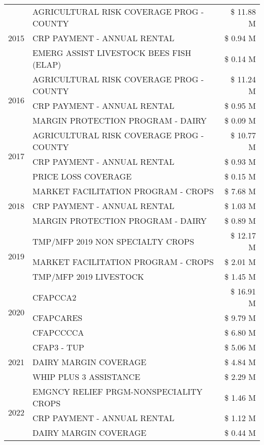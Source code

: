 \begin{tabular}{llr}
\cline{1-3}
\multirow[t]{3}{*}{2015} & AGRICULTURAL RISK COVERAGE PROG - COUNTY & \$ 11.88 M \\
 & CRP PAYMENT - ANNUAL RENTAL & \$ 0.94 M \\
 & EMERG ASSIST LIVESTOCK BEES FISH (ELAP) & \$ 0.14 M \\
\cline{1-3}
\multirow[t]{3}{*}{2016} & AGRICULTURAL RISK COVERAGE PROG - COUNTY & \$ 11.24 M \\
 & CRP PAYMENT - ANNUAL RENTAL & \$ 0.95 M \\
 & MARGIN PROTECTION PROGRAM - DAIRY & \$ 0.09 M \\
\cline{1-3}
\multirow[t]{3}{*}{2017} & AGRICULTURAL RISK COVERAGE PROG - COUNTY & \$ 10.77 M \\
 & CRP PAYMENT - ANNUAL RENTAL & \$ 0.93 M \\
 & PRICE LOSS COVERAGE & \$ 0.15 M \\
\cline{1-3}
\multirow[t]{3}{*}{2018} & MARKET FACILITATION PROGRAM - CROPS & \$ 7.68 M \\
 & CRP PAYMENT - ANNUAL RENTAL & \$ 1.03 M \\
 & MARGIN PROTECTION PROGRAM - DAIRY & \$ 0.89 M \\
\cline{1-3}
\multirow[t]{3}{*}{2019} & TMP/MFP 2019 NON SPECIALTY CROPS & \$ 12.17 M \\
 & MARKET FACILITATION PROGRAM - CROPS & \$ 2.01 M \\
 & TMP/MFP 2019 LIVESTOCK & \$ 1.45 M \\
\cline{1-3}
\multirow[t]{3}{*}{2020} & CFAPCCA2 & \$ 16.91 M \\
 & CFAPCARES & \$ 9.79 M \\
 & CFAPCCCCA & \$ 6.80 M \\
\cline{1-3}
\multirow[t]{3}{*}{2021} & CFAP3 - TUP & \$ 5.06 M \\
 & DAIRY MARGIN COVERAGE & \$ 4.84 M \\
 & WHIP PLUS 3 ASSISTANCE & \$ 2.29 M \\
\cline{1-3}
\multirow[t]{3}{*}{2022} & EMGNCY RELIEF PRGM-NONSPECIALITY CROPS & \$ 1.46 M \\
 & CRP PAYMENT - ANNUAL RENTAL & \$ 1.12 M \\
 & DAIRY MARGIN COVERAGE & \$ 0.44 M \\
\cline{1-3}
\bottomrule
\end{tabular}
